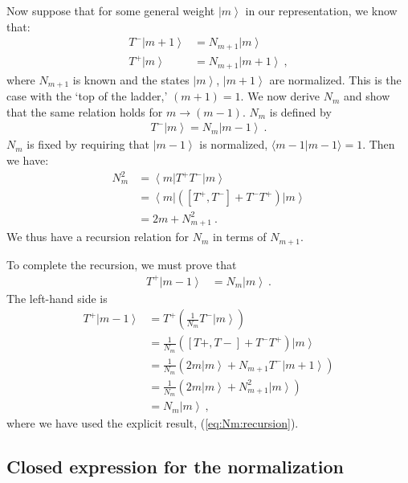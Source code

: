 \documentclass[12pt]{article}
\numberwithin{equation}{section}
\newcommand{\ket}[1]{\left|#1\right\rangle}    %
\newcommand{\bra}[1]{\left\langle#1\right|}    %
\begin{document}
Now suppose that for some general weight $\ket{m}$ in our representation, we know that:
\begin{align}
	T^- \ket{m+1} &= N_{m+1} \ket{m} \\
	T^+ \ket{m} &= N_{m+1} \ket{m+1} \ ,
\end{align}
where $N_{m+1}$ is known and the states $\ket{m}$, $\ket{m+1}$ are normalized. This is the case with the `top of the ladder,' $(m+1) = 1$. We now derive $N_m$ and show that the same relation holds for $m\to (m-1)$. $N_m$ is defined by
\begin{align}
	T^- \ket{m} = N_m \ket{m-1} \ .
\end{align}
$N_m$ is fixed by requiring that $\ket{m-1}$ is normalized, $\langle m-1 | m-1\rangle = 1$. Then we have:
\begin{align}
	N_m^2  &= \bra{m} T^+ T^- \ket{m} \\
	&= \bra{m} \left( [T^+,T^-] + T^-T^+ \right) \ket{m}\\
	&= 2m +  N_{m+1}^2 \ . \label{eq:Nm:recursion}
\end{align}
We thus have a recursion relation for $N_m$ in terms of $N_{m+1}$.

To complete the recursion, we must prove that
\begin{align}
	T^+ \ket{m-1} & = N_m \ket{m} \ .
\end{align}
The left-hand side is
\begin{align}
	T^+ \ket{m-1} &= T^+ \left(\frac{1}{N_m} T^- \ket{m}\right)\\
	& = \frac{1}{N_m} \left( [T+,T-] + T^-T^+ \right) \ket{m} \\
	& = \frac{1}{N_m} \left( 2m \ket{m} + N_{m+1}T^- \ket{m+1} \right) \\
	& = \frac{1}{N_m} \left( 2m \ket{m} + N_{m+1}^2 \ket{m} \right) \\
	& = N_m \ket{m} \ ,
\end{align}
where we have used the explicit result, (\ref{eq:Nm:recursion}). 

\subsection{Closed expression for the normalization}
\end{document}

